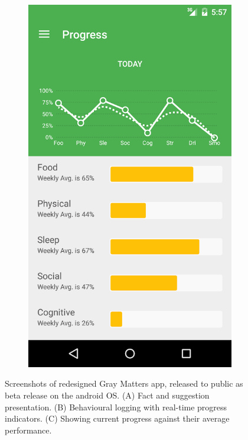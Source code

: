 \begin{figure}[h]
\begin{subfigure}[t]{0.3\textwidth}
        \includegraphics[width=\textwidth]{Files/prevention-study-3/figures/gm-new-performance}
        \caption{}
        \label{fig: gm-new-performance}
    \end{subfigure}
    \caption{Screenshots of redesigned Gray Matters app, released to public as beta release on the android OS. (A) Fact and suggestion presentation. (B) Behavioural logging with real-time progress indicators. (C) Showing current progress against their average performance.}
    \label{fig: graymatters-new}
\end{figure}

